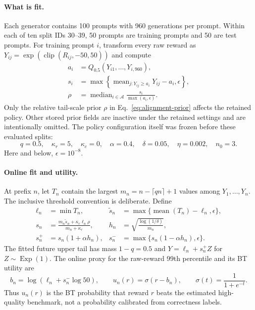 \paragraph{What is fit.}
Each generator contains 100 prompts with 960 generations per prompt.  Within
each of ten split IDs 30--39, 50 prompts are training prompts and 50 are test
prompts.  For training prompt $i$, transform every raw reward as
$Y_{ij}=\exp(\operatorname{clip}(R_{ij},-50,50))$ and compute
\begin{align}
  a_i &= Q_{0.5}(Y_{i1},\ldots,Y_{i,960}),\\
  s_i &= \max\!\left\{
    \operatorname{mean}_{j:Y_{ij}\ge a_i}Y_{ij}-a_i,\epsilon
  \right\},\\
  \rho &= \operatorname{median}_{i\in\mathcal A}
           \frac{s_i}{\max(a_i,\epsilon)}.
  \label{eq:alignment-prior}
\end{align}
Only the relative tail-scale prior $\rho$ in
Eq.~\eqref{eq:alignment-prior} affects the retained policy.  Other stored
prior fields are inactive under the retained settings and are intentionally
omitted.  The policy configuration itself was frozen before these evaluated
splits:
\begin{equation}
 q=0.5,\quad \kappa_r=5,\quad \kappa_c=0,\quad
 \alpha=0.4,\quad \delta=0.05,\quad \eta=0.002,
 \quad n_0=3.
 \label{eq:alignment-config}
\end{equation}
Here and below, $\epsilon=10^{-8}$.

\paragraph{Online fit and utility.}
At prefix $n$, let $T_n$ contain the largest
$m_n=n-\lceil qn\rceil+1$ values among $Y_1,\ldots,Y_n$.  The inclusive
threshold convention is deliberate.  Define
\begin{align}
  \ell_n&=\min T_n,
  &\widetilde s_n&=\max\{\operatorname{mean}(T_n)-\ell_n,\epsilon\},\\
  s_n&=\frac{m_n\widetilde s_n+\kappa_r\ell_n\rho}{m_n+\kappa_r},
  &h_n&=\sqrt{\frac{\log(1/\delta)}{m_n}},\\
  s_n^+&=s_n(1+\alpha h_n),
  &s_n^-&=\max\{s_n(1-\alpha h_n),\epsilon\}.
  \label{eq:alignment-tail}
\end{align}
The fitted future upper tail has mass $1-q=0.5$ and
$Y=\ell_n+s_n^+Z$ for $Z\sim\operatorname{Exp}(1)$.  The online proxy for the
raw-reward 99th percentile and its BT utility are
\begin{equation}
  b_n=\log\!\left(\ell_n+s_n^-\log 50\right),
  \qquad u_n(r)=\sigma(r-b_n),
  \qquad \sigma(t)=\frac{1}{1+e^{-t}}.
  \label{eq:alignment-bt}
\end{equation}
Thus $u_n(r)$ is the BT probability that reward $r$ beats the estimated
high-quality benchmark, not a probability calibrated from correctness labels.

